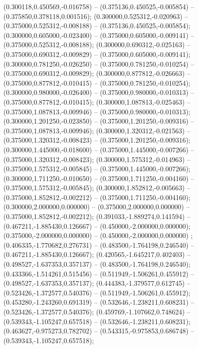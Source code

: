  (0.300118,0.450569,-0.016758) -- (0.375136,0.450525,-0.005854) -- (0.375850,0.378118,0.001516);
 (0.300000,0.525312,-0.020963) -- (0.375000,0.525312,-0.008188) -- (0.375136,0.450525,-0.005854);
 (0.300000,0.605000,-0.023400) -- (0.375000,0.605000,-0.009141) -- (0.375000,0.525312,-0.008188);
 (0.300000,0.690312,-0.025163) -- (0.375000,0.690312,-0.009829) -- (0.375000,0.605000,-0.009141);
 (0.300000,0.781250,-0.026250) -- (0.375000,0.781250,-0.010254) -- (0.375000,0.690312,-0.009829);
 (0.300000,0.877812,-0.026663) -- (0.375000,0.877812,-0.010415) -- (0.375000,0.781250,-0.010254);
 (0.300000,0.980000,-0.026400) -- (0.375000,0.980000,-0.010313) -- (0.375000,0.877812,-0.010415);
 (0.300000,1.087813,-0.025463) -- (0.375000,1.087813,-0.009946) -- (0.375000,0.980000,-0.010313);
 (0.300000,1.201250,-0.023850) -- (0.375000,1.201250,-0.009316) -- (0.375000,1.087813,-0.009946);
 (0.300000,1.320312,-0.021563) -- (0.375000,1.320312,-0.008423) -- (0.375000,1.201250,-0.009316);
 (0.300000,1.445000,-0.018600) -- (0.375000,1.445000,-0.007266) -- (0.375000,1.320312,-0.008423);
 (0.300000,1.575312,-0.014963) -- (0.375000,1.575312,-0.005845) -- (0.375000,1.445000,-0.007266);
 (0.300000,1.711250,-0.010650) -- (0.375000,1.711250,-0.004160) -- (0.375000,1.575312,-0.005845);
 (0.300000,1.852812,-0.005663) -- (0.375000,1.852812,-0.002212) -- (0.375000,1.711250,-0.004160);
 (0.300000,2.000000,0.000000) -- (0.375000,2.000000,0.000000) -- (0.375000,1.852812,-0.002212);
 (0.391033,-1.889274,0.141594) -- (0.467211,-1.885430,0.126667) -- (0.450000,-2.000000,0.000000);
 (0.375000,-2.000000,0.000000) -- (0.450000,-2.000000,0.000000) ;
 (0.406335,-1.770682,0.276731) -- (0.483500,-1.764198,0.246540) -- (0.467211,-1.885430,0.126667);
 (0.420565,-1.645217,0.402403) -- (0.498527,-1.637353,0.357137) -- (0.483500,-1.764198,0.246540);
 (0.433366,-1.514261,0.515456) -- (0.511949,-1.506261,0.455912) -- (0.498527,-1.637353,0.357137);
 (0.444383,-1.379577,0.612745) -- (0.523426,-1.372577,0.540376) -- (0.511949,-1.506261,0.455912);
 (0.453280,-1.243260,0.691319) -- (0.532646,-1.238211,0.608231) -- (0.523426,-1.372577,0.540376);
 (0.459769,-1.107662,0.748624) -- (0.539343,-1.105247,0.657518) -- (0.532646,-1.238211,0.608231);
 (0.463627,-0.975273,0.782702) -- (0.543315,-0.975853,0.686748) -- (0.539343,-1.105247,0.657518);
